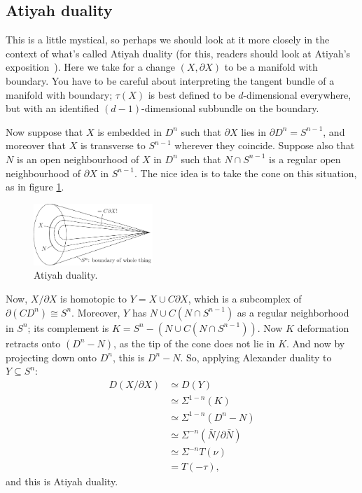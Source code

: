 \documentclass{article}
\newcommand{\Suspend}{\Sigma}
\theoremstyle{definition}
\begin{document}
\subsection*{Atiyah duality}
This is a little mystical, so perhaps we should look at it more closely in the context of what's called Atiyah duality (for this, readers should look at Atiyah's exposition~\cite{Atiyah}).  Here we take for a change $(X, \partial X)$ to be a manifold with boundary.  You have to be careful about interpreting the tangent bundle of a manifold with boundary; $\tau(X)$ is best defined to be $d$-dimensional everywhere, but with an identified $(d-1)$-dimensional subbundle on the boundary.  %

Now suppose that $X$ is embedded in $D^n$ such that $\partial X$ lies in $\partial D^n=S^{n-1}$, and moreover that $X$ is transverse to $S^{n-1}$ wherever they coincide. Suppose also that $N$ is an open neighbourhood of $X$ in $D^n$ such that $N\cap S^{n-1}$ is a regular open neighbourhood of $\partial X$ in $S^{n-1}$.
The nice idea is to take the cone on this situation, as in figure \ref{AtiyahDuality}.
\begin{figure}[h!]
\centering\includegraphics[width=0.4\textwidth]{figures/figure29.pdf}
\caption{\small Atiyah duality.}\label{AtiyahDuality}
\end{figure}

Now, $X / \partial X$ is homotopic to  $Y = X \cup C \partial X$, which is a subcomplex of $\partial(CD^n)\cong S^n$.  Moreover, $Y$ has $N \cup C(N \cap S^{n-1})$ as a regular neighborhood in $S^n$; its complement is $K=S^n - (N \cup C(N \cap S^{n-1}))$.  Now $K$ deformation retracts onto $(D^n-N)$, as the tip of the cone does not lie in $K$. And now by projecting down onto $D^n$, this is $D^n - N$.  So, applying Alexander duality to $Y\subseteq S^n$:
\begin{align*}
D(X / \partial X) & \simeq D(Y) \\
& \simeq \Suspend^{1-n}(K) \\
& \simeq \Suspend^{1-n}(D^n - N) \\
& \simeq \Suspend^{-n}(\bar N / \partial \bar N) \\
& \simeq \Suspend^{-n} T (\nu)\\
& = T(-\tau),
\end{align*}
and this is Atiyah duality.  
\end{document}
